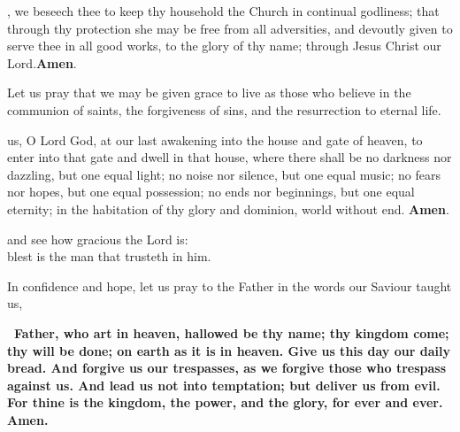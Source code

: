 , we beseech thee to keep thy household the Church in continual godliness;
that through thy protection she may be free from all adversities, and devoutly
given to serve thee in all good works, to the glory of thy name; through Jesus Christ
our Lord.\textbf{Amen}.


Let us pray that we may be given grace to live as those who believe in the communion
of saints, the forgiveness of sins, and the resurrection to eternal life.

 us, O Lord God, at our last awakening into the house and gate of heaven, to
enter into that gate and dwell in that house, where there shall be no darkness nor
dazzling, but one equal light; no noise nor silence, but one equal music; no fears nor
hopes, but one equal possession; no ends nor beginnings, but one equal eternity; in the
habitation of thy glory and dominion, world without end. \textbf{Amen}.\\
\hfill{}


\begin{center}
	
 and see how gracious the Lord is:\\
blest is the man that trusteth in him.
\end{center}






In confidence and hope, let us pray to the Father in the words our Saviour taught us,

\bfseries\ Father, who art in heaven, hallowed be thy name; thy kingdom
come; thy will be done; on earth as it is in heaven. Give us this day
our daily bread. And forgive us our trespasses, as we forgive those who
trespass against us. And lead us not into temptation; but deliver us from
evil. For thine is the kingdom, the power, and the glory, for ever and ever.\\
Amen.\normalfont



